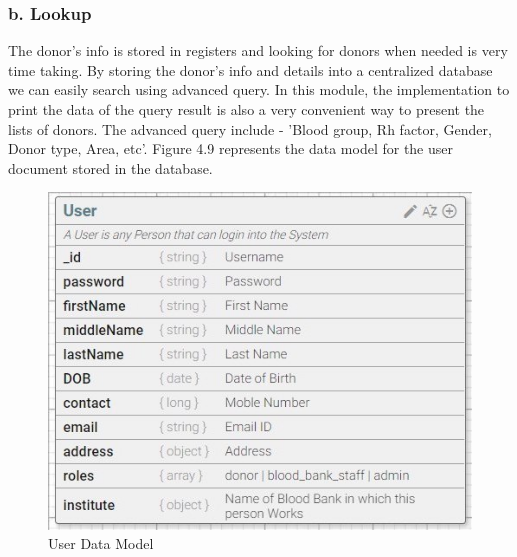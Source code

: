 \documentclass[BTech]{srmuthesis}
\begin{document}
\subsubsection{b. Lookup}
The donor's info is stored in registers and looking for donors when needed is very time taking. By storing the donor's info and details into a centralized database we can easily search using advanced query. In this module, the implementation to print the data of the query result is also a very convenient way to present the lists of donors. The advanced query include - 'Blood group, Rh factor, Gender, Donor type,  Area, etc'. Figure 4.9 represents the data model for the user document stored in the database.
\begin{figure}[H]
	\centering
	\includegraphics[scale=0.6]{lookup_user.jpeg}
	\caption{User Data Model}
\end{figure}
\end{document}
